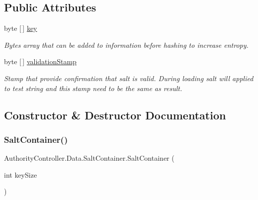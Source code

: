 \subsection*{Public Attributes}
\begin{DoxyCompactItemize}
\item 
byte \mbox{[}$\,$\mbox{]} \mbox{\hyperlink{class_authority_controller_1_1_data_1_1_salt_container_acae5788a34706594948537b7e4c305b4}{key}}
\begin{DoxyCompactList}\small\item\em Bytes array that can be added to information before hashing to increase entropy. \end{DoxyCompactList}\item 
byte \mbox{[}$\,$\mbox{]} \mbox{\hyperlink{class_authority_controller_1_1_data_1_1_salt_container_aba6d56ea2dda89e430cc4049407bba73}{validation\+Stamp}}
\begin{DoxyCompactList}\small\item\em Stamp that provide confirmation that salt is valid. During loading salt will applied to test string and this stamp need to be the same as result. \end{DoxyCompactList}\end{DoxyCompactItemize}


\subsection{Constructor \& Destructor Documentation}
\mbox{\label{class_authority_controller_1_1_data_1_1_salt_container_ab4ddbf8061e1cb70a6f3c10c917ff4a7}} 
\subsubsection{\texorpdfstring{Salt\+Container()}{SaltContainer()}}
{\footnotesize\ttfamily Authority\+Controller.\+Data.\+Salt\+Container.\+Salt\+Container (\begin{DoxyParamCaption}\item[{int}]{key\+Size }\end{DoxyParamCaption})}



